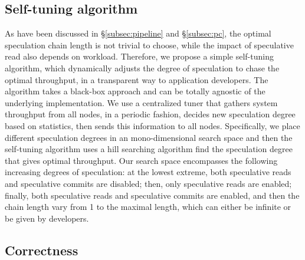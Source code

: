 \subsection{Self-tuning algorithm}
\label{subsec:tuning}
As have been discussed in \S \ref{subsec:pipeline} and \S \ref{subsec:pc}, the optimal speculation chain length is not trivial to choose, while the impact of speculative read also depends on workload. Therefore, we propose a simple self-tuning algorithm, which dynamically adjusts the degree of speculation to chase the optimal throughput, in a transparent way to application developers. The algorithm takes a black-box approach and can be totally agnostic of the underlying implementation. We use a centralized tuner that gathers system throughput from all nodes, in a periodic fashion, decides new speculation degree based on statistics, then sends this information to all nodes. Specifically, we place different speculation degrees in an mono-dimensional search space and then the self-tuning algorithm uses a hill searching algorithm \cite{hillclimbing} find the speculation degree that gives optimal throughput. Our search space encompasses the following increasing degrees of speculation: at the lowest extreme, both speculative reads and speculative commits are disabled; then, only speculative reads are enabled; finally, both speculative reads and speculative commits are enabled, and then the chain length vary from 1 to the maximal length, which can either be infinite or be given by developers. 



\iffalse
\subsection{Correctness}
